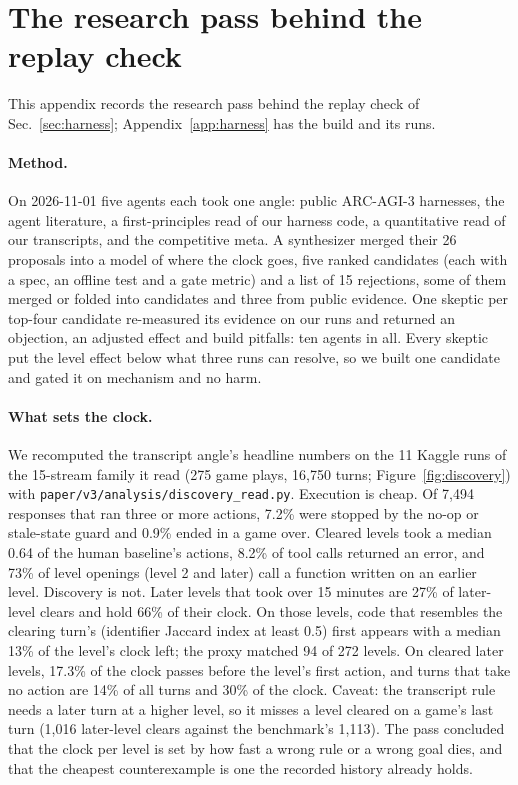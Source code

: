 \section{The research pass behind the replay check}\label{app:research}

This appendix records the research pass behind the replay check of Sec.~\ref{sec:harness}; Appendix~\ref{app:harness} has the build and its runs. %

\paragraph{Method.}
On 2026-11-01 five agents each took one angle: public ARC-AGI-3 harnesses, the agent literature, a first-principles read of our harness code, a quantitative read of our transcripts, and the competitive meta. %
A synthesizer merged their 26 proposals into a model of where the clock goes, five ranked candidates (each with a spec, an offline test and a gate metric) and a list of 15 rejections, some of them merged or folded into candidates and three from public evidence. %
One skeptic per top-four candidate re-measured its evidence on our runs and returned an objection, an adjusted effect and build pitfalls: ten agents in all. %
Every skeptic put the level effect below what three runs can resolve, so we built one candidate and gated it on mechanism and no harm. %

\paragraph{What sets the clock.}
We recomputed the transcript angle's headline numbers on the 11 Kaggle runs of the 15-stream family it read (275 game plays, 16,750 turns; Figure~\ref{fig:discovery}) with \texttt{paper/v3/analysis/discovery\_read.py}. %
Execution is cheap. %
Of 7,494 responses that ran three or more actions, 7.2\% were stopped by the no-op or stale-state guard and 0.9\% ended in a game over. Cleared levels took a median 0.64 of the human baseline's actions, 8.2\% of tool calls returned an error, and 73\% of level openings (level 2 and later) call a function written on an earlier level. %
Discovery is not. %
Later levels that took over 15 minutes are 27\% of later-level clears and hold 66\% of their clock. On those levels, code that resembles the clearing turn's (identifier Jaccard index at least 0.5) first appears with a median 13\% of the level's clock left; the proxy matched 94 of 272 levels. %
On cleared later levels, 17.3\% of the clock passes before the level's first action, and turns that take no action are 14\% of all turns and 30\% of the clock. %
Caveat: the transcript rule needs a later turn at a higher level, so it misses a level cleared on a game's last turn (1,016 later-level clears against the benchmark's 1,113). %
The pass concluded that the clock per level is set by how fast a wrong rule or a wrong goal dies, and that the cheapest counterexample is one the recorded history already holds. %

